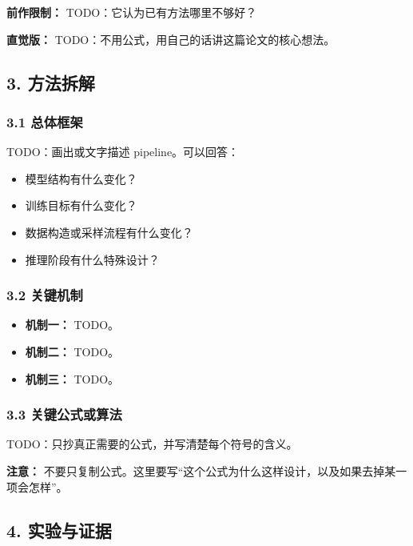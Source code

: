 \textbf{前作限制：} TODO：它认为已有方法哪里不够好？

\begin{intubox}
\textbf{直觉版：} TODO：不用公式，用自己的话讲这篇论文的核心想法。
\end{intubox}

\subsection{3. 方法拆解}

\subsubsection{3.1 总体框架}

TODO：画出或文字描述 pipeline。可以回答：

\begin{itemize}[leftmargin=1.5em]
  \item 模型结构有什么变化？
  \item 训练目标有什么变化？
  \item 数据构造或采样流程有什么变化？
  \item 推理阶段有什么特殊设计？
\end{itemize}

\subsubsection{3.2 关键机制}

\begin{itemize}[leftmargin=1.5em]
  \item \textbf{机制一：} TODO。
  \item \textbf{机制二：} TODO。
  \item \textbf{机制三：} TODO。
\end{itemize}

\subsubsection{3.3 关键公式或算法}

TODO：只抄真正需要的公式，并写清楚每个符号的含义。

\begin{warnbox}
\textbf{注意：} 不要只复制公式。这里要写“这个公式为什么这样设计，以及如果去掉某一项会怎样”。
\end{warnbox}

\subsection{4. 实验与证据}

